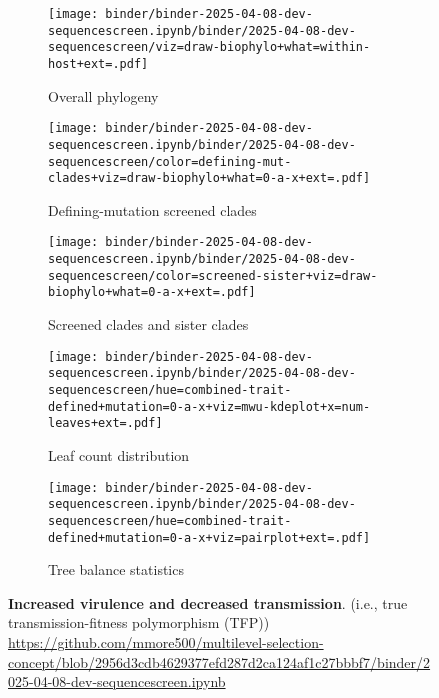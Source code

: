 \begin{figure*}[htbp]
  \centering
  \begin{subfigure}{0.32\textwidth}
    \centering
    \texttt{[image: binder/binder-2025-04-08-dev-sequencescreen.ipynb/binder/2025-04-08-dev-sequencescreen/viz=draw-biophylo+what=within-host+ext=.pdf]}
    \caption{Overall phylogeny}
    \label{fig:dev-sequencescreen:overall_phylogeny}
  \end{subfigure}
  \hfill
  \begin{subfigure}{0.32\textwidth}
    \centering
    \texttt{[image: binder/binder-2025-04-08-dev-sequencescreen.ipynb/binder/2025-04-08-dev-sequencescreen/color=defining-mut-clades+viz=draw-biophylo+what=0-a-x+ext=.pdf]}
    \caption{Defining-mutation screened clades}
    \label{fig:dev-sequencescreen:defining_mut_clades}
  \end{subfigure}
  \hfill
  \begin{subfigure}{0.32\textwidth}
    \centering
    \texttt{[image: binder/binder-2025-04-08-dev-sequencescreen.ipynb/binder/2025-04-08-dev-sequencescreen/color=screened-sister+viz=draw-biophylo+what=0-a-x+ext=.pdf]}
    \caption{Screened clades and sister clades}
    \label{fig:dev-sequencescreen:screened_sister}
  \end{subfigure}

  \vspace{0.5cm} %

  \begin{subfigure}{0.54\textwidth}
    \centering
    \texttt{[image: binder/binder-2025-04-08-dev-sequencescreen.ipynb/binder/2025-04-08-dev-sequencescreen/hue=combined-trait-defined+mutation=0-a-x+viz=mwu-kdeplot+x=num-leaves+ext=.pdf]}
    \caption{Leaf count distribution}
    \label{fig:dev-sequencescreen:leaf_count}
  \end{subfigure}
  \hfill
  \begin{subfigure}{0.44\textwidth}
    \centering
    \texttt{[image: binder/binder-2025-04-08-dev-sequencescreen.ipynb/binder/2025-04-08-dev-sequencescreen/hue=combined-trait-defined+mutation=0-a-x+viz=pairplot+ext=.pdf]}
    \caption{Tree balance statistics}
    \label{fig:dev-sequencescreen:tree_balance}
  \end{subfigure}

  \caption{\textbf{Increased virulence and decreased transmission}. (i.e., true transmission-fitness polymorphism (TFP)) \url{https://github.com/mmore500/multilevel-selection-concept/blob/2956d3cdb4629377efd287d2ca124af1c27bbbf7/binder/2025-04-08-dev-sequencescreen.ipynb}}
  \label{fig:dev-sequencescreen}
\end{figure*}
